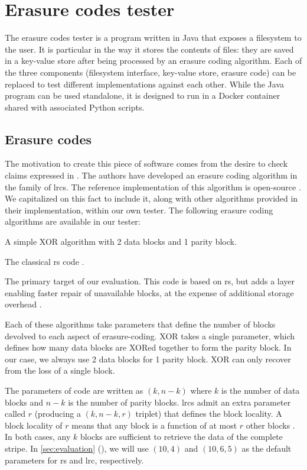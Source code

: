 \section{Erasure codes tester}

The erasure codes tester is a program written in Java that exposes a filesystem to the user.
It is particular in the way it stores the contents of files: they are saved in a key-value store after being processed by an erasure coding algorithm.
Each of the three components (filesystem interface, key-value store, erasure code) can be replaced to test different implementations against each other.
While the Java program can be used standalone, it is designed to run in a Docker container shared with associated Python scripts.

\subsection{Erasure codes}

The motivation to create this piece of software comes from the desire to check claims expressed in  \autocite{XorbasVLDB}.
The authors have developed an erasure coding algorithm in the family of \acfp{lrc}.
The reference implementation of this algorithm is open-source \autocite{xorbas-github}.
We capitalized on this fact to include it, along with other algorithms provided in their implementation, within our own tester.
The following erasure coding algorithms are available in our tester:
\begin{description}
\item[XOR] A simple XOR algorithm with 2 data blocks and 1 parity block.
\item[\acs{rs}] The classical \acf{rs} code \autocite{reed-solomon}.
\item[\acs{lrc}] The primary target of our evaluation. This code is based on \ac{rs}, but adds a layer enabling faster repair of unavailable blocks, at the expense of additional storage overhead \autocite{XorbasVLDB}.
\end{description}

Each of these algorithms take parameters that define the number of blocks devolved to each aspect of erasure-coding.
XOR takes a single parameter, which defines how many data blocks are XORed together to form the parity block.
In our case, we always use 2 data blocks for 1 parity block.
XOR can only recover from the loss of a single block.

The parameters of  code are written as $(k,n-k)$ where $k$ is the number of data blocks and $n-k$ is the number of parity blocks.
\acp{lrc} admit an extra parameter called $r$ (producing a $(k,n-k,r)$ triplet) that defines the block locality.
A block locality of $r$ means that any block is a function of at most $r$ other blocks \autocite{XorbasVLDB}.
In both cases, any $k$ blocks are sufficient to retrieve the data of the complete stripe.
In \autoref{sec:evaluation} (), we will use $(10,4)$ and $(10,6,5)$ as the default parameters for \ac{rs} and \ac{lrc}, respectively.

